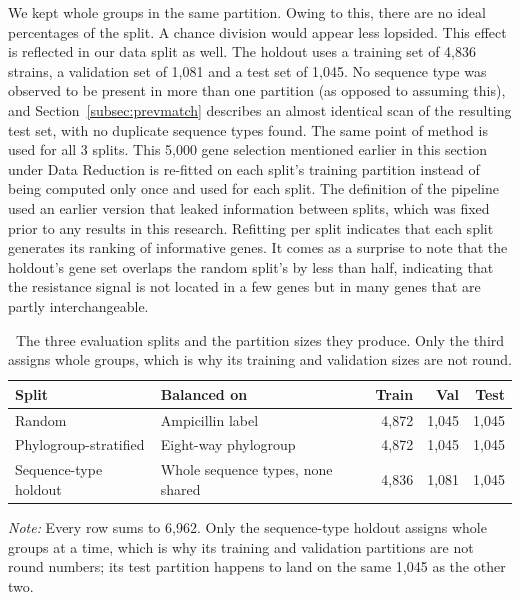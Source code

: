We kept whole groups in the same partition. Owing to this, there are no ideal percentages of
the split. A chance division would appear less lopsided. This effect is reflected in our data
split as well. The holdout uses a training set of 4,836 strains, a
validation set of 1,081 and a test set of 1,045. No sequence type was observed to be present in
more than one partition (as opposed to assuming this), and Section~\ref{subsec:prevmatch}
describes an almost identical scan of the resulting test set, with no duplicate sequence types
found. The same point of method is used for all 3 splits. This 5,000 gene selection mentioned
earlier in this section under Data Reduction is re-fitted on each split's training partition
instead of being computed only once and used for each split. The definition of the pipeline
used an earlier version that leaked information between splits, which was fixed prior to any
results in this research. Refitting per split indicates that each split generates its ranking of
informative genes. It comes as a surprise to note that the holdout's gene set overlaps the
random split's by less than half, indicating that the resistance signal is not located in a
few genes but in many genes that are partly interchangeable.

\begin{table}[htb]
\centering
\caption{The three evaluation splits and the partition sizes they produce. Only the
third assigns whole groups, which is why its training and validation sizes are not
round.}
\label{tab:splits}
\small
\begin{tabular}{|l|l|r|r|r|}
\hline
\textbf{Split} & \textbf{Balanced on} & \textbf{Train} & \textbf{Val} & \textbf{Test} \\
\hline
Random & Ampicillin label & 4{,}872 & 1{,}045 & 1{,}045 \\ \hline
Phylogroup-stratified & Eight-way phylogroup & 4{,}872 & 1{,}045 & 1{,}045 \\ \hline
Sequence-type holdout & Whole sequence types, none shared & 4{,}836 & 1{,}081 & 1{,}045 \\ \hline
\end{tabular}
\vspace{0.4em}

\noindent\footnotesize\textit{Note:} Every row sums to 6{,}962. Only the sequence-type holdout
assigns whole groups at a time, which is why its training and validation partitions are not
round numbers; its test partition happens to land on the same 1{,}045 as the other two.
\end{table}

